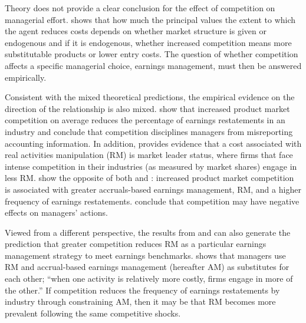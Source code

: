\documentclass[notitlepage, 12pt]{article}
\begin{document}

Theory does not provide a clear conclusion for the effect of competition on managerial effort. \citet{raith:2003} shows that how much the principal values the extent to which the agent reduces costs depends on whether market structure is given or endogenous and if it is endogenous, whether increased competition means more substitutable products or lower entry costs. The question of whether competition affects a specific managerial choice, earnings management, must then be answered empirically.
\newline

\noindent Consistent with the mixed theoretical predictions, the empirical evidence on the direction of the relationship is also mixed. \citet{bc:2012} show that increased product market competition on average reduces the percentage of earnings restatements in an industry and conclude that competition disciplines managers from misreporting accounting information. In addition, \citet{zang:2012} provides evidence that a cost associated with real activities manipulation (RM) is market leader status, where firms that face intense competition in their industries (as measured by market shares) engage in less RM. \citet{kst:2012} show the opposite of both \citeauthor{bc:2012} and \citeauthor{zang:2012}: increased product market competition is associated with greater accruals-based earnings management, RM, and a higher frequency of earnings restatements. \citeauthor{kst:2012} conclude that competition may have negative effects on managers' actions.
\newline

\noindent Viewed from a different perspective, the results from \citet{bc:2012} and \citet{zang:2012} can also generate the prediction that greater competition reduces RM as a particular earnings management strategy to meet earnings benchmarks. \citeauthor{zang:2012} shows that managers use RM and accrual-based earnings management (hereafter AM) as substitutes for each other; ``when one activity is relatively more costly, firms engage in more of the other.'' If competition reduces the frequency of earnings restatements by industry through constraining AM, then it may be that RM becomes more prevalent following the same competitive shocks.
\newline
\end{document}
